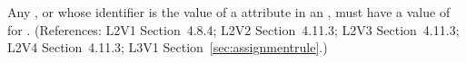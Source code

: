 Any \Compartment, \Species or \Parameter whose identifier is the value of a
 attribute in an \AssignmentRule, must have a value of
 for .  (References: L2V1 Section~4.8.4; L2V2
Section~4.11.3; L2V3 Section~4.11.3; L2V4 Section~4.11.3; L3V1 Section~\ref{sec:assignmentrule}.)

